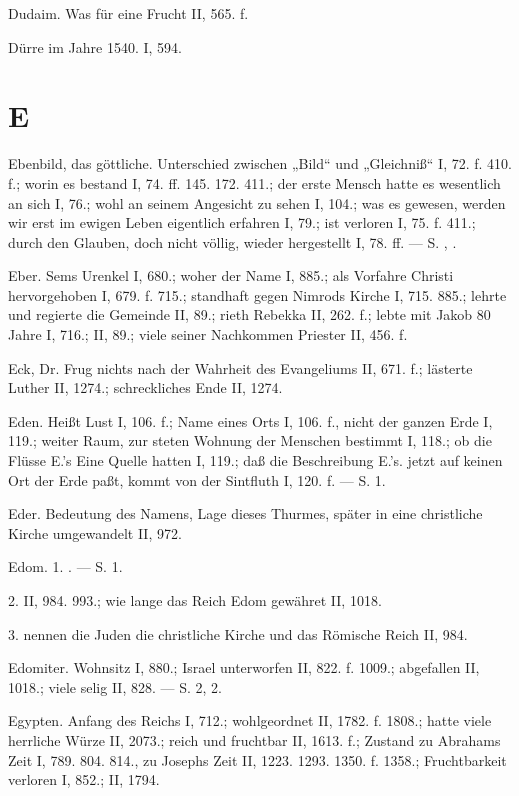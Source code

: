 Dudaim. Was für eine Frucht II, 565. f.

Dürre im Jahre 1540. I, 594.

\section{E}

Ebenbild, das göttliche. Unterschied zwischen „Bild“ und „Gleichniß“ I, 72. f. 410. f.; worin es bestand I, 74. ff. 145. 172. 411.; der erste Mensch hatte es wesentlich an sich I, 76.; wohl an seinem Angesicht zu sehen I, 104.; was es gewesen, werden wir erst im ewigen Leben eigentlich erfahren I, 79.; ist verloren I, 75. f. 411.; durch den Glauben, doch nicht völlig, wieder hergestellt I, 78. ff. — S. , .

Eber. Sems Urenkel I, 680.; woher der Name I, 885.; als Vorfahre Christi hervorgehoben I, 679. f. 715.; standhaft gegen Nimrods Kirche I, 715. 885.; lehrte und regierte die Gemeinde II, 89.; rieth Rebekka II, 262. f.; lebte mit Jakob 80 Jahre I, 716.; II, 89.; viele seiner Nachkommen Priester II, 456. f.

Eck, Dr. Frug nichts nach der Wahrheit des Evangeliums II, 671. f.; lästerte Luther II, 1274.; schreckliches Ende II, 1274.

Eden. Heißt Lust I, 106. f.; Name eines Orts I, 106. f., nicht der ganzen Erde I, 119.; weiter Raum, zur steten Wohnung der Menschen bestimmt I, 118.; ob die Flüsse E.’s Eine Quelle hatten I, 119.; daß die Beschreibung E.’s. jetzt auf keinen Ort der Erde paßt, kommt von der Sintfluth I, 120. f. — S.  1.

Eder. Bedeutung des Namens, Lage dieses Thurmes, später in eine christliche Kirche umgewandelt II, 972.

Edom. 1. . — S.  1.

2.  II, 984. 993.; wie lange das Reich Edom gewähret II, 1018.

3.  nennen die Juden die christliche Kirche und das Römische Reich II, 984.

Edomiter. Wohnsitz I, 880.; Israel unterworfen II, 822. f. 1009.; abgefallen II, 1018.; viele selig II, 828. — S.  2,  2.

Egypten. Anfang des Reichs I, 712.; wohlgeordnet II, 1782. f. 1808.; hatte viele herrliche Würze II, 2073.; reich und fruchtbar II, 1613. f.; Zustand zu Abrahams Zeit I, 789. 804. 814., zu Josephs Zeit II, 1223. 1293. 1350. f. 1358.; Fruchtbarkeit verloren I, 852.; II, 1794.

